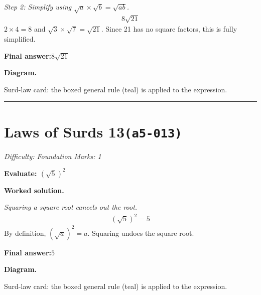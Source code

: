 \documentclass[11pt]{article}
\newcommand{\question}[1]{\par\medskip\noindent\textbf{#1}\par}
\begin{document}
\textit{Step 2: Simplify using \( \sqrt{a} \times \sqrt{b} = \sqrt{ab} \).}
\[\begin{gathered}
8\sqrt{21}
\end{gathered}\]
\( 2 \times 4 = 8 \) and \( \sqrt{3} \times \sqrt{7} = \sqrt{21} \). Since 21 has no square factors, this is fully simplified.

\begin{answerbox}
\textbf{Final answer:}\quad \(\displaystyle 8\sqrt{21}\)
\end{answerbox}
\textbf{Diagram.}

\begin{center}
\end{center}
\small Surd-law card: the boxed general rule (teal) is applied to the expression.\normalsize

\medskip\hrule

\section*{Laws of Surds 13\quad\small\texttt{(a5-013)}}
\textit{Difficulty: Foundation \quad\textbar\quad Marks: 1}

\question{Evaluate: \( (\sqrt{5})^2 \)}

\textbf{Worked solution.}

\textit{Squaring a square root cancels out the root.}
\[\begin{gathered}
(\sqrt{5})^2 = 5
\end{gathered}\]
By definition, \( (\sqrt{a})^2 = a \). Squaring undoes the square root.

\begin{answerbox}
\textbf{Final answer:}\quad \(\displaystyle 5\)
\end{answerbox}
\textbf{Diagram.}

\begin{center}
\end{center}
\small Surd-law card: the boxed general rule (teal) is applied to the expression.\normalsize
\end{document}
